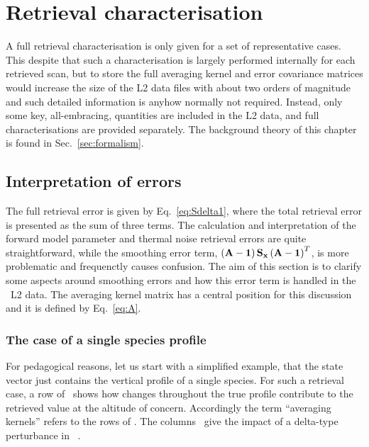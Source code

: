 \chapter{Retrieval characterisation}
\label{chapter:characterisation}
%
A full retrieval characterisation is only given for a set of representative
cases. This despite that such a characterisation is largely performed
internally for each retrieved scan, but to store the full averaging kernel and
error covariance matrices would increase the size of the L2 data files with
about two orders of magnitude and such detailed information is anyhow normally
not required. Instead, only some key, all-embracing, quantities are included in
the L2 data, and full characterisations are provided separately. The background
theory of this chapter is found in Sec.~\ref{sec:formalism}.
 


\section{Interpretation of errors}
%
The full retrieval error is given by Eq.~\ref{eq:Sdelta1}, where the total
retrieval error is presented as the sum of three terms. The calculation and
interpretation of the forward model parameter and thermal noise retrieval
errors are quite straightforward, while the smoothing error term,
$\left(\mathbf{A}-\mathbf{1}\right)\mathbf{S}_{\mathbf{x}}\left(\mathbf{A}-\mathbf{1}\right)^T$,
is more problematic and frequenctly causes confusion. The aim of this section
is to clarify some aspects around smoothing errors and how this error term is
handled in the \smr\ L2 data. The averaging kernel matrix has a central
position for this discussion and it is defined by Eq.~\ref{eq:A}.


\subsection*{The case of a single species profile}
%
For pedagogical reasons, let us start with a simplified example, that the state
vector just contains the vertical profile of a single species. For such a
retrieval case, a row of \AvrKrnMtr\ shows how changes throughout the true
profile contribute to the retrieved value at the altitude of concern.
Accordingly the term ``averaging kernels'' refers to the rows of \AvrKrnMtr.
The columns \AvrKrnMtr\ give the impact of a delta-type perturbance in \SttVct\
\citep{rodgers:00}.


